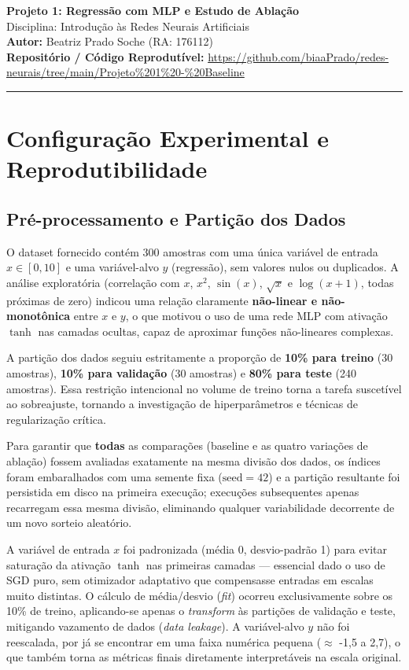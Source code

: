 \documentclass[11pt,a4paper]{article}
\begin{document}
\begin{center}
    {\LARGE \textbf{Projeto 1: Regressão com MLP e Estudo de Ablação}} \\[0.35em]
    {\large Disciplina: Introdução às Redes Neurais Artificiais} \\[0.3em]
    \textbf{Autor:} {Beatriz Prado Soche (RA: 176112)} \\[0.2em]
    \textbf{Repositório / Código Reprodutível:} \url{https://github.com/biaaPrado/redes-neurais/tree/main/Projeto%201%20-%20Baseline}
\end{center}
\vspace{-0.5em}
\hrule
\vspace{0.8em}

\section{Configuração Experimental e Reprodutibilidade}

\subsection{Pré-processamento e Partição dos Dados}
O dataset fornecido contém 300 amostras com uma única variável de entrada $x \in [0, 10]$ e uma variável-alvo $y$ (regressão), sem valores nulos ou duplicados. A análise exploratória (correlação com $x$, $x^2$, $\sin(x)$, $\sqrt{x}$ e $\log(x+1)$, todas próximas de zero) indicou uma relação claramente \textbf{não-linear e não-monotônica} entre $x$ e $y$, o que motivou o uso de uma rede MLP com ativação $\tanh$ nas camadas ocultas, capaz de aproximar funções não-lineares complexas.

A partição dos dados seguiu estritamente a proporção de \textbf{10\% para treino} (30 amostras), \textbf{10\% para validação} (30 amostras) e \textbf{80\% para teste} (240 amostras). Essa restrição intencional no volume de treino torna a tarefa suscetível ao sobreajuste, tornando a investigação de hiperparâmetros e técnicas de regularização crítica.

Para garantir que \textbf{todas} as comparações (baseline e as quatro variações de ablação) fossem avaliadas exatamente na mesma divisão dos dados, os índices foram embaralhados com uma semente fixa ($\text{seed}=42$) e a partição resultante foi persistida em disco na primeira execução; execuções subsequentes apenas recarregam essa mesma divisão, eliminando qualquer variabilidade decorrente de um novo sorteio aleatório.

A variável de entrada $x$ foi padronizada (média 0, desvio-padrão 1) para evitar saturação da ativação $\tanh$ nas primeiras camadas — essencial dado o uso de SGD puro, sem otimizador adaptativo que compensasse entradas em escalas muito distintas. O cálculo de média/desvio (\textit{fit}) ocorreu exclusivamente sobre os 10\% de treino, aplicando-se apenas o \textit{transform} às partições de validação e teste, mitigando vazamento de dados (\textit{data leakage}). A variável-alvo $y$ não foi reescalada, por já se encontrar em uma faixa numérica pequena ($\approx$ -1,5 a 2,7), o que também torna as métricas finais diretamente interpretáveis na escala original.
\end{document}
